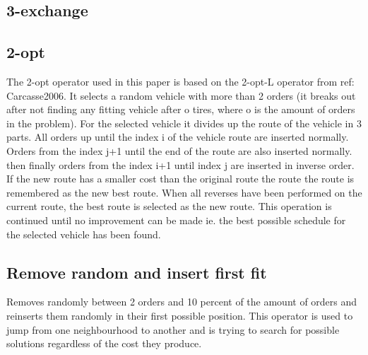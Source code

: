 \documentclass[../main.tex]{subfiles}
\begin{document}
\subsection{3-exchange}
\label{sec:exch}


\subsection{2-opt}
\label{sec:2opt}
The 2-opt operator used in this paper is based on the 2-opt-L operator from {ref: Carcasse2006}. 
It selects a random vehicle with more than 2 orders (it breaks out after not finding any fitting vehicle after o tires, where o is the amount of orders in the problem).
For the selected vehicle it divides up the route of the vehicle in 3 parts. 
All orders up until the index i of the vehicle route are inserted normally. 
Orders from the index j+1 until the end of the route are also inserted normally. 
then finally orders from the index i+1 until index j are inserted in inverse order.
If the new route has a smaller cost than the original route the route the route is remembered as the new best route. 
When all reverses have been performed on the current route, the best route is selected as the new route.
This operation is continued until no improvement can be made ie. the best possible schedule for the selected vehicle has been found.

\subsection{Remove random and insert first fit}
\label{sec:rand}
Removes randomly between 2 orders and 10 percent of the amount of orders and reinserts them randomly in their first possible position. 
This operator is used to jump from one neighbourhood to another and is trying to search for possible solutions regardless of the cost they produce.
\end{document}
